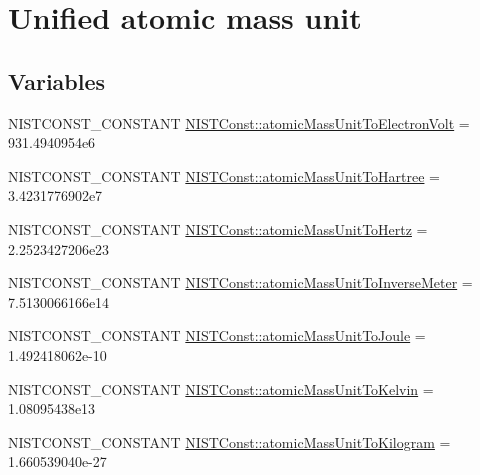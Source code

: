 \hypertarget{group___n_i_s_t_const-_atomic_mass_unit}{}\section{Unified atomic mass unit}
\label{group___n_i_s_t_const-_atomic_mass_unit}
\subsection*{Variables}
\begin{DoxyCompactItemize}
\item 
N\+I\+S\+T\+C\+O\+N\+S\+T\+\_\+\+C\+O\+N\+S\+T\+A\+NT \mbox{\hyperlink{group___n_i_s_t_const-_atomic_mass_unit_ga25c8b97ae8d15ad0a827672a167161fc}{N\+I\+S\+T\+Const\+::atomic\+Mass\+Unit\+To\+Electron\+Volt}} = 931.\+4940954e6
\item 
N\+I\+S\+T\+C\+O\+N\+S\+T\+\_\+\+C\+O\+N\+S\+T\+A\+NT \mbox{\hyperlink{group___n_i_s_t_const-_atomic_mass_unit_gabc1d9560508c08af70cd236ca08dfbff}{N\+I\+S\+T\+Const\+::atomic\+Mass\+Unit\+To\+Hartree}} = 3.\+4231776902e7
\item 
N\+I\+S\+T\+C\+O\+N\+S\+T\+\_\+\+C\+O\+N\+S\+T\+A\+NT \mbox{\hyperlink{group___n_i_s_t_const-_atomic_mass_unit_ga202ebb9eeb0f916c91b074d07ba403d5}{N\+I\+S\+T\+Const\+::atomic\+Mass\+Unit\+To\+Hertz}} = 2.\+2523427206e23
\item 
N\+I\+S\+T\+C\+O\+N\+S\+T\+\_\+\+C\+O\+N\+S\+T\+A\+NT \mbox{\hyperlink{group___n_i_s_t_const-_atomic_mass_unit_gaa66e75563e7a7c28bc3c4b5c4ab482a1}{N\+I\+S\+T\+Const\+::atomic\+Mass\+Unit\+To\+Inverse\+Meter}} = 7.\+5130066166e14
\item 
N\+I\+S\+T\+C\+O\+N\+S\+T\+\_\+\+C\+O\+N\+S\+T\+A\+NT \mbox{\hyperlink{group___n_i_s_t_const-_atomic_mass_unit_ga8c1405e0299d1388f1452bf4e04778f9}{N\+I\+S\+T\+Const\+::atomic\+Mass\+Unit\+To\+Joule}} = 1.\+492418062e-\/10
\item 
N\+I\+S\+T\+C\+O\+N\+S\+T\+\_\+\+C\+O\+N\+S\+T\+A\+NT \mbox{\hyperlink{group___n_i_s_t_const-_atomic_mass_unit_ga74d5a7e0d6f6182731b839a578353769}{N\+I\+S\+T\+Const\+::atomic\+Mass\+Unit\+To\+Kelvin}} = 1.\+08095438e13
\item 
N\+I\+S\+T\+C\+O\+N\+S\+T\+\_\+\+C\+O\+N\+S\+T\+A\+NT \mbox{\hyperlink{group___n_i_s_t_const-_atomic_mass_unit_ga72ba2b08855b26ea2477c3e8104bbc16}{N\+I\+S\+T\+Const\+::atomic\+Mass\+Unit\+To\+Kilogram}} = 1.\+660539040e-\/27
\end{DoxyCompactItemize}


